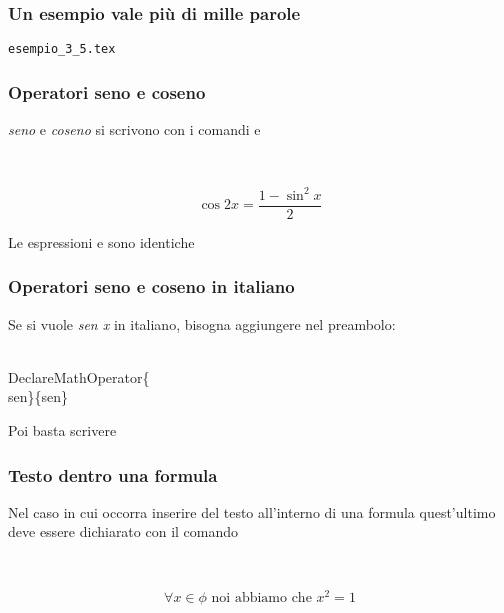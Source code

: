 \begin{frame}
  \frametitle{Un esempio vale pi\`u di mille parole}
	\begin{center}
		\alert{\texttt{esempio\_3\_5.tex}}
	\end{center}
\end{frame}
\begin{frame}
  \frametitle{Operatori seno e coseno}
	\emph{seno} e \emph{coseno} si scrivono con i comandi  e 
	\begin{LaTeXcode}
		\\[\n
		 \hspace*{5ex}\alert{\\cos}2x=\\frac\{1-\alert{\\sin}\textasciicircum2x\}\{2\}\n
		\\]
	\end{LaTeXcode}
	\begin{LaTeXoutput}
		\[
			\cos2x=\frac{1-\sin^2x}{2}
		\]
	\end{LaTeXoutput}
  \bigskip
	\medskip Le espressioni  e   sono identiche
\end{frame}
\begin{frame}
  \frametitle{Operatori seno e coseno in italiano}
	Se si vuole \emph{sen x} in italiano, bisogna aggiungere nel preambolo:
	\begin{LaTeXcode}
		\\DeclareMathOperator\{\\sen\}\{sen\}
	\end{LaTeXcode}
	\medskip Poi basta scrivere 
\end{frame}
\begin{frame}
  \frametitle{Testo dentro una formula}
	Nel caso in cui occorra inserire del testo all'interno di una formula quest'ultimo deve essere dichiarato con il comando 
 	\begin{LaTeXcode}
		\\[\n
		\hspace*{5ex}\\forall x\\in\\phi\alert{\\text\{\ noi abbiamo che \}}x\textasciicircum\{2\}=1\n
		\\]
 	\end{LaTeXcode}
	\begin{LaTeXoutput}
		\[
			\forall x\in\phi\text{ noi abbiamo che } x^{2}=1
		\]
	\end{LaTeXoutput}
\end{frame}
